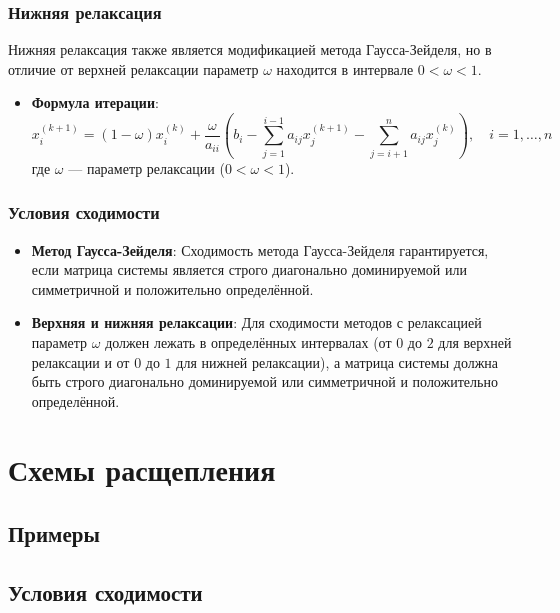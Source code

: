 \documentclass{article}
\begin{document}
\subsubsection{Нижняя релаксация}

Нижняя релаксация также является модификацией метода Гаусса-Зейделя, но в отличие от верхней релаксации параметр \( \omega \) находится в интервале \( 0 < \omega < 1 \).

\begin{itemize}
  \item \textbf{Формула итерации}:
  \[
  x_i^{(k+1)} = (1-\omega) x_i^{(k)} + \frac{\omega}{a_{ii}} \left( b_i - \sum_{j=1}^{i-1} a_{ij} x_j^{(k+1)} - \sum_{j=i+1}^{n} a_{ij} x_j^{(k)} \right), \quad i = 1, \ldots, n
  \]
  где \( \omega \) — параметр релаксации (\( 0 < \omega < 1 \)).
\end{itemize}

\subsubsection{Условия сходимости}

\begin{itemize}
  \item \textbf{Метод Гаусса-Зейделя}: Сходимость метода Гаусса-Зейделя гарантируется, если матрица системы является строго диагонально доминируемой или симметричной и положительно определённой.
  
  \item \textbf{Верхняя и нижняя релаксации}: Для сходимости методов с релаксацией параметр \( \omega \) должен лежать в определённых интервалах (от \( 0 \) до \( 2 \) для верхней релаксации и от \( 0 \) до \( 1 \) для нижней релаксации), а матрица системы должна быть строго диагонально доминируемой или симметричной и положительно определённой.
\end{itemize}

\section{Схемы расщепления}

\subsection{Примеры}
\subsection{Условия сходимости}
\end{document}
